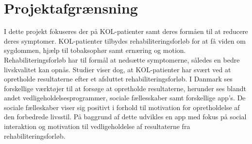 \section{Projektafgrænsning}
I dette projekt fokuseres der på KOL-patienter samt deres formåen til at reducere deres symptomer. KOL-patienter tilbydes rehabiliteringsforløb for at få viden om sygdommen, hjælp til tobaksophør samt ernæring og motion. Rehabiliteringsforløb har til formål at nedsætte symptomerne, således en bedre livskvalitet kan opnås. Studier viser dog, at KOL-patienter har svært ved at opretholde resultaterne efter et afsluttet rehabiliteringsforløb. I Danmark ses forskellige værktøjer til at forsøge at opretholde resultaterne, herunder ses blandt andet vedligeholdelsesprogrammer, sociale fællesskaber samt forskellige app's. De sociale fælleskaber viser sig positivt i forhold til motivation for opretholdelse af den forbedrede livsstil. 
På baggrund af dette udvikles en app med fokus på social interaktion og motivation til vedligeholdelse af resultaterne fra rehabiliteringsforløb. 
